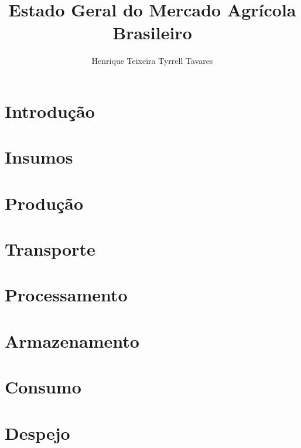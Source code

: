 \documentclass[]{article}
\title{Estado Geral do Mercado Agrícola Brasileiro}
\author{Henrique Teixeira Tyrrell Tavares}
\begin{document}
\maketitle

\begin{abstract}

\end{abstract}

\section{Introdução}

\section{Insumos}

\section{Produção}

\section{Transporte}

\section{Processamento}

\section{Armazenamento}

\section{Consumo}

\section{Despejo}
\end{document}
